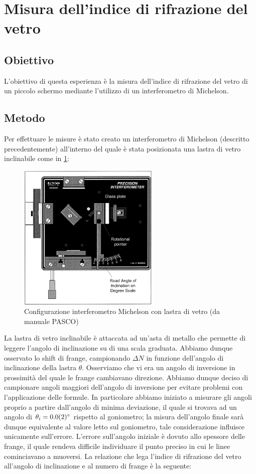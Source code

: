 \documentclass[a4paper]{article}
\begin{document}
\section{Misura dell'indice di rifrazione del vetro}
\subsection{Obiettivo}
L'obiettivo di questa esperienza è la misura dell'indice di rifrazione del vetro di un piccolo schermo mediante l'utilizzo di un interferometro di Michelson.
\subsection{Metodo}
Per effettuare le misure è stato creato un interferometro di Michelson (descritto precedentemente) all'interno del quale è stata posizionata una lastra di vetro inclinabile come in \cref{fig:michelson-vetro}:
\begin{figure}[htbp]
\centering
\includegraphics[width=0.6\textwidth]{./grafici/Michaelson vetro.png}
\caption{Configurazione interferometro Michelson con lastra di vetro (da manuale PASCO)}
\label{fig:michelson-vetro}
\end{figure}
La lastra di vetro inclinabile è attaccata ad un'asta di metallo che permette di leggere l'angolo di inclinazione su di una scala graduata. Abbiamo dunque osservato lo shift di frange, campionando $\Delta N$ in funzione dell'angolo di inclinazione della lastra $\theta$. Osserviamo che vi era un angolo di inversione in prossimità del quale le frange cambiavano direzione. Abbiamo dunque deciso di campionare angoli maggiori dell'angolo di inversione per evitare problemi con l'applicazione delle formule. In particolare abbiamo iniziato a misurare gli angoli proprio a partire dall'angolo di minima deviazione, il quale si trovava ad un angolo di $\theta_i = \SI{0 \pm 0.2}{\degree}$ rispetto al goniometro; la misura dell'angolo finale sarà dunque equivalente al valore letto sul goniometro, tale considerazione influisce unicamente sull'errore. L'errore sull'angolo iniziale è dovuto allo spessore delle frange, il quale rendeva difficile individuare il punto preciso in cui le linee cominciavano a muoversi. La relazione che lega l'indice di rifrazione del vetro all'angolo di inclinazione e al numero di frange è la seguente:
\end{document}
